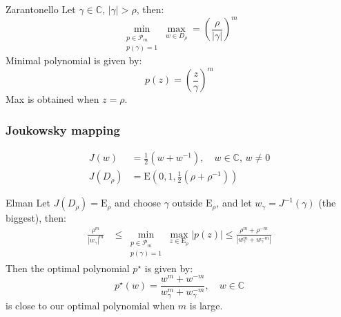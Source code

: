 \begin{lemma}{Zarantonello}{}
    Let $\gamma \in \mathbb{C}$, $|\gamma| > \rho$, then:
    \[
        \min_{\substack{p \in \mathcal{P}_m \\ p(\gamma) = 1}} \max_{w \in D_\rho} = \left(\frac{\rho}{|\gamma|}\right)^m
    \]
    Minimal polynomial is given by:
    \[
        p(z) = \left(\frac{z}{\gamma}\right)^m
    \]
    Max is obtained when $z = \rho$.
\end{lemma}

\subsubsection{Joukowsky mapping}
\begin{align*}
    J(w)      & = \frac{1}{2}(w + w^{-1}), \quad w \in \mathbb{C}, \, w \neq 0 \\
    J(D_\rho) & = \mathrm{E}(0,1, \frac12(\rho + \rho^{-1}))
\end{align*}
\begin{theorem}{Elman}{}
    Let $J(D_\rho) = \mathrm{E}_\rho$ and choose $\gamma$ outside $\mathrm{E}_\rho$, and let  $ w_\gamma = J^{-1}(\gamma)$ (the biggest), then:
    \begin{align*}
        \frac{\rho^m}{|w_\gamma|^m} & \leq \min_{\substack{p \in \mathcal{P}_m \\ p(\gamma) = 1}} \max_{z \in \mathrm{E}_\rho} |p(z)| \leq \frac{\rho^m + \rho^{-m}}{|w_\gamma^m + w_\gamma^{-m}|}
    \end{align*}
    Then the optimal polynomial $p^\star$ is given by:
    \[
        p^\star(w) = \frac{w^m + w^{-m}}{w_\gamma^m + w_\gamma^{-m}}, \quad w \in \mathbb{C}
    \]
    is close to our optimal polynomial when $m$ is large.
\end{theorem}

